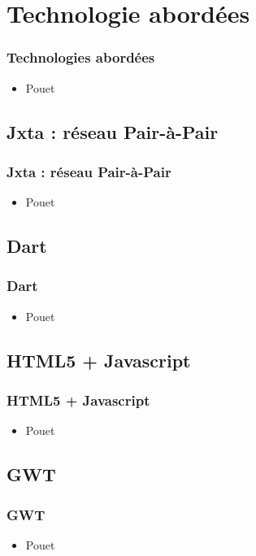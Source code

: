 \section{Technologie abordées}
  \begin{frame}
    \frametitle{Technologies abordées}
    \begin{itemize}
      \item Pouet
    \end{itemize}
  \end{frame}

  \subsection*{Jxta : réseau Pair-à-Pair}
    \begin{frame}
      \frametitle{Jxta : réseau Pair-à-Pair}
      \begin{itemize}
        \item Pouet
      \end{itemize}
    \end{frame}

  \subsection*{Dart}
    \begin{frame}
      \frametitle{Dart}
      \begin{itemize}
        \item Pouet
      \end{itemize}
    \end{frame}

  \subsection*{HTML5 + Javascript}
    \begin{frame}
      \frametitle{HTML5 + Javascript}
      \begin{itemize}
        \item Pouet
      \end{itemize}
    \end{frame}

  \subsection*{GWT}
    \begin{frame}
      \frametitle{GWT}
      \begin{itemize}
        \item Pouet
      \end{itemize}
    \end{frame}


